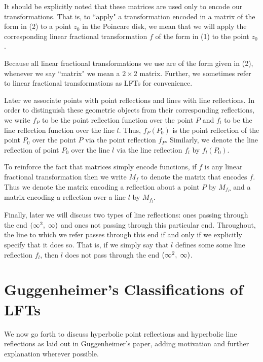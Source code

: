 \documentclass[12pt]{article}
\newcommand{\ttc}{, \hspace{1mm}}
\newcommand{\specialend}{(\infty^2\ttc\infty)}
\theoremstyle{plain}
\theoremstyle{definition}
\begin{document}
It should be explicitly noted that these matrices are used only to encode our transformations. That is, to ``apply" a transformation encoded in a matrix of the form in (2) to a point $z_0$ in the Poincare disk, we mean that we will apply the corresponding linear fractional transformation $f$ of the form in (1) to the point $z_0$. 

Because all linear fractional transformations we use are of the form given in (2), whenever we say ``matrix" we mean a $2 \times 2$ matrix. Further, we sometimes refer to linear fractional transformations as LFTs for convenience. 

Later we associate points with point reflections and lines with line reflections. In order to distinguish these geometric objects from their corresponding reflections, we write $f_P$ to be the point reflection function over the point $P$ and $f_l$ to be the line reflection function over the line $l$. Thus, $f_P(P_0)$ is the point reflection of the point $P_0$ over the point $P$ via the point reflection $f_P$. Similarly, we denote the line reflection of point $P_0$ over the line $l$ via the line reflection $f_l$ by $f_l(P_0)$.

To reinforce the fact that matrices simply encode functions, if $f$ is any linear fractional transformation then we write $M_f$ to denote the matrix that encodes $f$. Thus we denote the matrix encoding a reflection about a point $P$ by $M_{f_P}$ and a matrix encoding a reflection over a line $l$ by $M_{f_l}$. 

Finally, later we will discuss two types of line reflections: ones passing through the end $\specialend$ and ones not passing through this particular end. Throughout, the line to which we refer passes through this end if and only if we explicitly specify that it does so. That is, if we simply say that $l$ defines some some line reflection $f_l$, then $l$ does not pass through the end $\specialend$.

\section{Guggenheimer's Classifications of LFTs}

\hspace{10mm} We now go forth to discuss hyperbolic point reflections and hyperbolic line reflections as laid out in Guggenheimer's paper, adding motivation and further explanation wherever possible. 
\end{document}
